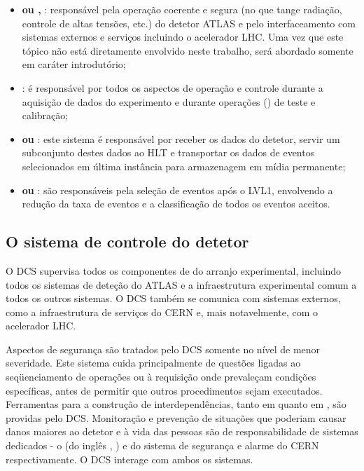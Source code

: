 \begin{itemize}
\item \textbf{ ou , }: responsável pela operação coerente e segura (no que tange
radiação, controle de altas tensões, etc.) do detetor ATLAS e pelo
interfaceamento com sistemas externos e serviços incluindo o acelerador
LHC. Uma vez que este tópico não está diretamente envolvido neste trabalho,
será abordado somente em caráter introdutório;

\item \textbf{}: é responsável por todos os aspectos de
operação e controle durante a aquisição de dados do experimento e durante
operações () de teste e calibração;

\item \textbf{ ou }: este sistema é
responsável por receber os dados do detetor, servir um subconjunto destes
dados ao HLT e transportar os dados de eventos selecionados em última
instância para armazenagem em mídia permanente;

\item \textbf{ ou }: são responsáveis pela
seleção de eventos após o LVL1, envolvendo a redução da taxa de eventos e a
classificação de todos os eventos aceitos.

\end{itemize}

\subsection{O sistema de controle do detetor}
\label{sec:dcs}

O DCS supervisa todos os componentes de  do arranjo
experimental, incluindo todos os sistemas de deteção do ATLAS e a
infraestrutura experimental comum a todos os outros sistemas. O DCS também se
comunica com sistemas externos, como a infraestrutura de serviços do CERN e,
mais notavelmente, com o acelerador LHC.

Aspectos de segurança são tratados pelo DCS somente no nível de menor
severidade. Este sistema cuida principalmente de questões ligadas ao
seqüenciamento de operações ou à requisição onde prevaleçam condições
específicas, antes de permitir que outros procedimentos sejam
executados. Ferramentas para a construção de interdependências, tanto em
 quanto em , são providas pelo DCS. Monitoração e
prevenção de situações que poderiam causar danos maiores ao detetor e à vida
das pessoas são de responsabilidade de sistemas dedicados - o  (do inglês , ) e
do sistema de segurança e alarme do CERN respectivamente. O DCS interage com
ambos os sistemas.

